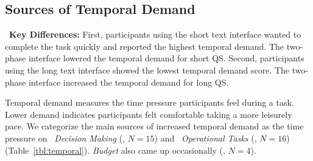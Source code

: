 




    



\subsection{Sources of Temporal Demand} 
\label{sec:temporal}

\begin{tldrbox}
   \faKey~\textbf{Key Differences:} %
    First, participants using the short text interface wanted to complete the task quickly and reported the highest temporal demand. The two-phase interface lowered the temporal demand for short QS. Second, participants using the long text interface showed the lowest temporal demand score. The two-phase interface increased the temporal demand for long QS.
\end{tldrbox}

Temporal demand measures the time pressure participants feel during a task. Lower demand indicates participants felt comfortable taking a more leisurely pace. We categorize the main sources of increased temporal demand as the time pressure on ~\textit{Decision Making} (, $N=15$) and ~\textit{Operational Tasks} (, $N=16$) (Table~\ref{tbl:temporal}). \textit{Budget} also came up occasionally (, $N=4$).

